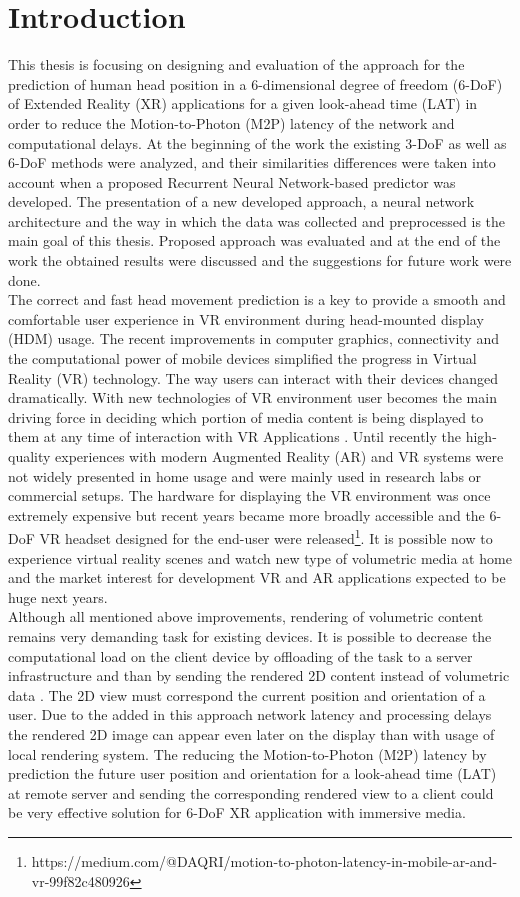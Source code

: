 \chapter{Introduction}
\label{sec:intro}
This thesis is focusing on designing and evaluation of the approach for the prediction of human head position in a 6-dimensional degree of freedom (6-DoF) of Extended Reality (XR) applications for a given look-ahead time (LAT) in order to reduce the Motion-to-Photon (M2P) latency of the network and computational delays. At the beginning of the work the existing 3-DoF as well as 6-DoF methods were analyzed, and their similarities differences were taken into account when a proposed Recurrent Neural Network-based predictor was developed. The presentation of a new developed approach, a neural network architecture and the way in which the data was collected and preprocessed is the main goal of this thesis. Proposed approach was evaluated and at the end of the work the obtained results were discussed and the suggestions for future work were done.\\
The correct and fast head movement prediction is a key to provide a smooth and comfortable user experience in VR environment during head-mounted display (HDM) usage. The recent improvements in computer graphics, connectivity and the computational power of mobile devices simplified the progress in Virtual Reality (VR) technology. The way users can interact with their devices changed dramatically. With new technologies of VR environment user becomes the main driving force in deciding which portion of media content is being displayed to them at any time of interaction with VR Applications \cite{new_challenge}. Until recently the high-quality experiences with modern Augmented Reality (AR) and VR systems were not widely presented in home usage and were mainly used in research labs or commercial setups. The hardware for displaying the VR environment was once extremely expensive but recent years became more broadly accessible and the 6-DoF VR headset designed for the end-user were released\footnote{https://medium.com/@DAQRI/motion-to-photon-latency-in-mobile-ar-and-vr-99f82c480926}. It is possible now to experience virtual reality scenes and watch new type of volumetric media at home and the market interest for development VR and AR applications expected to be huge next years.\\
Although all mentioned above improvements, rendering of volumetric content remains very demanding task for existing devices. It is possible to decrease the computational load on the client device by offloading of the task to a server infrastructure and than by sending the rendered 2D content instead of volumetric data \cite{serhan_cloud_streaming}. The 2D view must correspond the current position and orientation of a user. Due to the added in this approach network latency and processing delays the rendered 2D image can appear even later on the display than with usage of local rendering system. The reducing the Motion-to-Photon (M2P) latency by prediction the future user position and orientation for a look-ahead time (LAT) at remote server and sending the corresponding rendered view to a client could be very effective solution for 6-DoF XR application with immersive media. 


